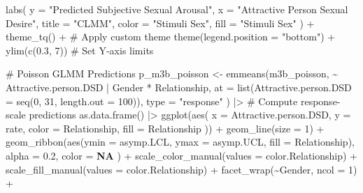 \documentclass[
  bookmarksnumbered]{article}
\newenvironment{Shaded}{\begin{snugshade}}{\end{snugshade}}
\newcommand{\AttributeTok}[1]{\textcolor[rgb]{0.80,0.80,0.80}{#1}}
\newcommand{\CommentTok}[1]{\textcolor[rgb]{0.50,0.62,0.50}{#1}}
\newcommand{\ConstantTok}[1]{\textcolor[rgb]{0.86,0.64,0.64}{\textbf{#1}}}
\newcommand{\DecValTok}[1]{\textcolor[rgb]{0.86,0.86,0.80}{#1}}
\newcommand{\FloatTok}[1]{\textcolor[rgb]{0.75,0.75,0.82}{#1}}
\newcommand{\FunctionTok}[1]{\textcolor[rgb]{0.94,0.94,0.56}{#1}}
\newcommand{\NormalTok}[1]{\textcolor[rgb]{0.80,0.80,0.80}{#1}}
\newcommand{\OtherTok}[1]{\textcolor[rgb]{0.94,0.94,0.56}{#1}}
\newcommand{\SpecialCharTok}[1]{\textcolor[rgb]{0.86,0.64,0.64}{#1}}
\newcommand{\StringTok}[1]{\textcolor[rgb]{0.80,0.58,0.58}{#1}}
\begin{document}
\begin{Shaded}
\begin{Highlighting}[]
  \FunctionTok{labs}\NormalTok{(}
    \AttributeTok{y =} \StringTok{"Predicted Subjective Sexual Arousal"}\NormalTok{, }\AttributeTok{x =} \StringTok{"Attractive Person Sexual Desire"}\NormalTok{,}
    \AttributeTok{title =} \StringTok{"CLMM"}\NormalTok{,}
    \AttributeTok{color =} \StringTok{"Stimuli Sex"}\NormalTok{, }\AttributeTok{fill =} \StringTok{"Stimuli Sex"}
\NormalTok{  ) }\SpecialCharTok{+}
  \FunctionTok{theme\_tq}\NormalTok{() }\SpecialCharTok{+} \CommentTok{\# Apply custom theme}
  \FunctionTok{theme}\NormalTok{(}\AttributeTok{legend.position =} \StringTok{"bottom"}\NormalTok{) }\SpecialCharTok{+}
  \FunctionTok{ylim}\NormalTok{(}\FunctionTok{c}\NormalTok{(}\FloatTok{0.3}\NormalTok{, }\DecValTok{7}\NormalTok{)) }\CommentTok{\# Set Y{-}axis limits}

\CommentTok{\# Poisson GLMM Predictions}
\NormalTok{p\_m3b\_poisson }\OtherTok{\textless{}{-}} \FunctionTok{emmeans}\NormalTok{(m3b\_poisson, }\SpecialCharTok{\textasciitilde{}}\NormalTok{ Attractive.person.DSD }\SpecialCharTok{|}\NormalTok{ Gender }\SpecialCharTok{*}\NormalTok{ Relationship,}
  \AttributeTok{at =} \FunctionTok{list}\NormalTok{(}\AttributeTok{Attractive.person.DSD =} \FunctionTok{seq}\NormalTok{(}\DecValTok{0}\NormalTok{, }\DecValTok{31}\NormalTok{, }\AttributeTok{length.out =} \DecValTok{100}\NormalTok{)),}
  \AttributeTok{type =} \StringTok{"response"}
\NormalTok{) }\SpecialCharTok{|\textgreater{}} \CommentTok{\# Compute response{-}scale predictions}
  \FunctionTok{as.data.frame}\NormalTok{() }\SpecialCharTok{|\textgreater{}}
  \FunctionTok{ggplot}\NormalTok{(}\FunctionTok{aes}\NormalTok{(}
    \AttributeTok{x =}\NormalTok{ Attractive.person.DSD, }\AttributeTok{y =}\NormalTok{ rate,}
    \AttributeTok{color =}\NormalTok{ Relationship, }\AttributeTok{fill =}\NormalTok{ Relationship}
\NormalTok{  )) }\SpecialCharTok{+}
  \FunctionTok{geom\_line}\NormalTok{(}\AttributeTok{size =} \DecValTok{1}\NormalTok{) }\SpecialCharTok{+}
  \FunctionTok{geom\_ribbon}\NormalTok{(}\FunctionTok{aes}\NormalTok{(}\AttributeTok{ymin =}\NormalTok{ asymp.LCL, }\AttributeTok{ymax =}\NormalTok{ asymp.UCL, }\AttributeTok{fill =}\NormalTok{ Relationship),}
    \AttributeTok{alpha =} \FloatTok{0.2}\NormalTok{, }\AttributeTok{color =} \ConstantTok{NA}
\NormalTok{  ) }\SpecialCharTok{+}
  \FunctionTok{scale\_color\_manual}\NormalTok{(}\AttributeTok{values =}\NormalTok{ color.Relationship) }\SpecialCharTok{+}
  \FunctionTok{scale\_fill\_manual}\NormalTok{(}\AttributeTok{values =}\NormalTok{ color.Relationship) }\SpecialCharTok{+}
  \FunctionTok{facet\_wrap}\NormalTok{(}\SpecialCharTok{\textasciitilde{}}\NormalTok{Gender, }\AttributeTok{ncol =} \DecValTok{1}\NormalTok{) }\SpecialCharTok{+}

\end{Highlighting}
\end{Shaded}
\end{document}
